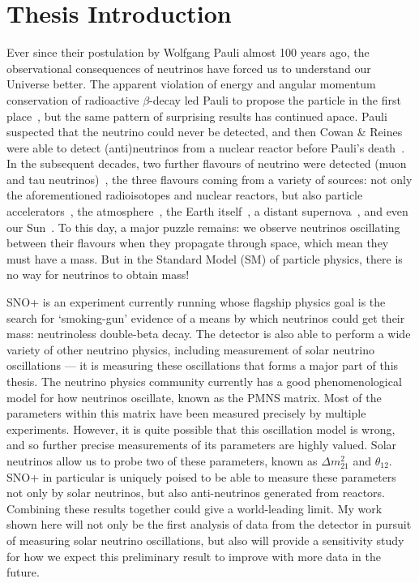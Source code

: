 \section{Thesis Introduction}\label{sect:Introduction}

Ever since their postulation by Wolfgang Pauli almost 100 years ago, the observational consequences of neutrinos have forced us to understand our Universe better. The apparent violation of energy and angular momentum conservation of radioactive $\beta$-decay led Pauli to propose the particle in the first place~\cite{}, but the same pattern of surprising results has continued apace. Pauli suspected that the neutrino could never be detected, and then Cowan \& Reines were able to detect (anti)neutrinos from a nuclear reactor before Pauli's death~\cite{}. In the subsequent decades, two further flavours of neutrino were detected (muon and tau neutrinos)~\cite{}, the three flavours coming from a variety of sources: not only the aforementioned radioisotopes and nuclear reactors, but also particle accelerators~\cite{}, the atmosphere~\cite{}, the Earth itself~\cite{}, a distant supernova~\cite{}, and even our Sun~\cite{}. To this day, a major puzzle remains: we observe neutrinos oscillating between their flavours when they propagate through space, which mean they must have a mass. But in the Standard Model (SM) of particle physics, there is no way for neutrinos to obtain mass!

SNO+ is an experiment currently running whose flagship physics goal is the search for `smoking-gun' evidence of a means by which neutrinos could get their mass: neutrinoless double-beta decay. The detector is also able to perform a wide variety of other neutrino physics, including measurement of solar neutrino oscillations --- it is measuring these oscillations that forms a major part of this thesis. The neutrino physics community currently has a good phenomenological model for how neutrinos oscillate, known as the PMNS matrix. Most of the parameters within this matrix have been measured precisely by multiple experiments. However, it is quite possible that this oscillation model is wrong, and so further precise measurements of its parameters are highly valued. Solar neutrinos allow us to probe two of these parameters, known as $\Delta m^{2}_{21}$ and $\theta_{12}$. SNO+ in particular is uniquely poised to be able to measure these parameters not only by solar neutrinos, but also anti-neutrinos generated from reactors. Combining these results together could give a world-leading limit. My work shown here will not only be the first analysis of data from the detector in pursuit of measuring solar neutrino oscillations, but also will provide a sensitivity study for how we expect this preliminary result to improve with more data in the future.


